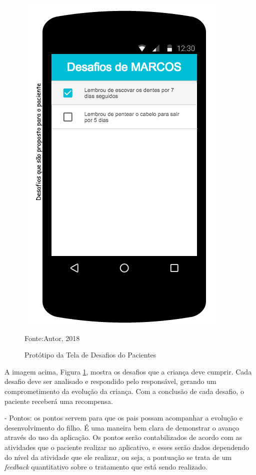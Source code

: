 \begin{itemize}
		\begin{figure}[H]
			\centering
			\includegraphics[scale=0.6]{img/desafiosparaopaciente.png}
			\caption{Protótipo da Tela de Desafios do Pacientes}
			Fonte:Autor, 2018
			\label{desafios}
		\end{figure}
		
		A imagem acima, Figura \ref{desafios}, mostra os desafios que a criança deve cumprir. Cada desafio deve ser analisado e respondido pelo responsável, gerando um comprometimento da evolução da criança. Com a conclusão de cada desafio, o paciente receberá uma recompensa.
		
		 - Pontos: os pontos servem para que os pais possam acompanhar a evolução e desenvolvimento do filho. É uma maneira bem clara de  demonstrar o avanço através do uso da aplicação. Os pontos serão contabilizados de acordo com as atividades que o paciente realizar no aplicativo, e esses serão dados dependendo do nível da atividade que ele realizar, ou seja, a pontuação se trata de um \textit{feedback} quantitativo sobre o tratamento que está sendo realizado.
		

\end{itemize}
